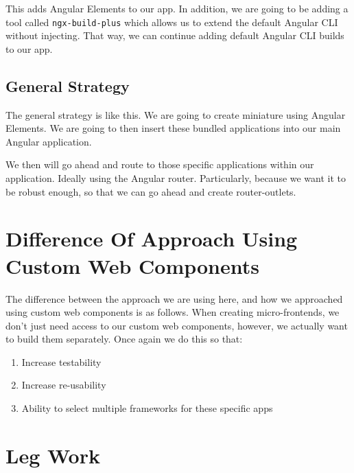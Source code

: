 This adds Angular Elements to our app. In addition, we are going to be adding a tool called \lstinline{ngx-build-plus} which allows us to extend the default Angular CLI without injecting. That way, we can continue adding default Angular CLI builds to our app. 

\subsection{General Strategy}
The general strategy is like this. We are going to create miniature using Angular Elements. We are going to then insert these bundled applications into our main Angular application. 

We then will go ahead and route to those specific applications within our application. Ideally using the Angular router. Particularly, because we want it to be robust enough, so that we can go ahead and create router-outlets. 

\section{Difference Of Approach Using Custom Web Components}
The difference between the approach we are using here, and how we approached using custom web components is as follows. When creating micro-frontends, we don't just need access to our custom web components, however, we actually want to build them separately. Once again we do this so that: 
\begin{enumerate}
  \item Increase testability
  \item Increase re-usability
  \item Ability to select multiple frameworks for these specific apps
\end{enumerate}

\section{Leg Work}
